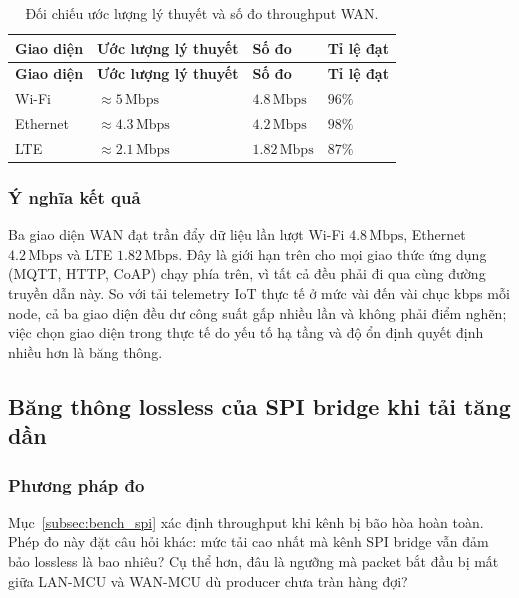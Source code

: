\begin{longtable}{|p{3.5cm}|p{4.5cm}|p{2.5cm}|p{2.5cm}|}
    \caption{Đối chiếu ước lượng lý thuyết và số đo throughput WAN.}
    \label{tab:theory_vs_meas} \\
    \hline
    \textbf{Giao diện} & \textbf{Ước lượng lý thuyết} & \textbf{Số đo} & \textbf{Tỉ lệ đạt} \\ \hline
    \endfirsthead
    \hline
    \textbf{Giao diện} & \textbf{Ước lượng lý thuyết} & \textbf{Số đo} & \textbf{Tỉ lệ đạt} \\ \hline
    \endhead
    \hline
    \endfoot
    \endlastfoot
    Wi-Fi & $\approx 5\,\text{Mbps}$ & $4{.}8\,\text{Mbps}$ & $96\%$ \\ \hline
    Ethernet & $\approx 4{.}3\,\text{Mbps}$ & $4{.}2\,\text{Mbps}$ & $98\%$ \\ \hline
    LTE & $\approx 2{.}1\,\text{Mbps}$ & $1{.}82\,\text{Mbps}$ & $87\%$ \\ \hline
\end{longtable}

\subsubsection{Ý nghĩa kết quả}

Ba giao diện WAN đạt trần đẩy dữ liệu lần lượt Wi-Fi $4{.}8\,\text{Mbps}$, Ethernet $4{.}2\,\text{Mbps}$ và LTE $1{.}82\,\text{Mbps}$. Đây là giới hạn trên cho mọi giao thức ứng dụng (MQTT, HTTP, CoAP) chạy phía trên, vì tất cả đều phải đi qua cùng đường truyền dẫn này. So với tải telemetry IoT thực tế ở mức vài đến vài chục kbps mỗi node, cả ba giao diện đều dư công suất gấp nhiều lần và không phải điểm nghẽn; việc chọn giao diện trong thực tế do yếu tố hạ tầng và độ ổn định quyết định nhiều hơn là băng thông.

\subsection{Băng thông lossless của SPI bridge khi tải tăng dần}
\label{subsec:bench_spi_ramp}

\subsubsection{Phương pháp đo}

Mục~\ref{subsec:bench_spi} xác định throughput khi kênh bị bão hòa hoàn toàn. Phép đo này đặt câu hỏi khác: mức tải cao nhất mà kênh SPI bridge vẫn đảm bảo lossless là bao nhiêu? Cụ thể hơn, đâu là ngưỡng mà packet bắt đầu bị mất giữa LAN-MCU và WAN-MCU dù producer chưa tràn hàng đợi?

